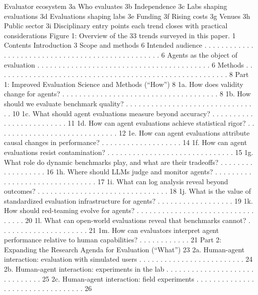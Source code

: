 Evaluator ecosystem
3a Who evaluates
3b Independence
3c Labs shaping evaluations
3d Evaluations shaping labs
3e Funding
3f
Rising costs
3g Venues
3h Public sector
3i
Disciplinary entry points
each trend closes with
practical considerations
Figure 1: Overview of the 33 trends surveyed in this paper.
1
Contents
Introduction
3
Scope and methods
6
Intended audience . . . . . . . . . . . . . . . . . . . . . . . . . . . . . . . . . . . . . . . . . . . . . . . . .
6
Agents as the object of evaluation . . . . . . . . . . . . . . . . . . . . . . . . . . . . . . . . . . . . . . . . .
6
Methods . . . . . . . . . . . . . . . . . . . . . . . . . . . . . . . . . . . . . . . . . . . . . . . . . . . . . . .
8
Part 1: Improved Evaluation Science and Methods (“How”)
8
1a. How does validity change for agents? . . . . . . . . . . . . . . . . . . . . . . . . . . . . . . . . . . . . .
8
1b. How should we evaluate benchmark quality?
. . . . . . . . . . . . . . . . . . . . . . . . . . . . . . . . 10
1c. What should agent evaluations measure beyond accuracy? . . . . . . . . . . . . . . . . . . . . . . . . . 11
1d. How can agent evaluations achieve statistical rigor? . . . . . . . . . . . . . . . . . . . . . . . . . . . . . 12
1e. How can agent evaluations attribute causal changes in performance? . . . . . . . . . . . . . . . . . . . 14
1f. How can agent evaluations resist contamination?
. . . . . . . . . . . . . . . . . . . . . . . . . . . . . . 15
1g. What role do dynamic benchmarks play, and what are their tradeoffs?
. . . . . . . . . . . . . . . . . . 16
1h. Where should LLMs judge and monitor agents? . . . . . . . . . . . . . . . . . . . . . . . . . . . . . . . 17
1i. What can log analysis reveal beyond outcomes? . . . . . . . . . . . . . . . . . . . . . . . . . . . . . . . 18
1j. What is the value of standardized evaluation infrastructure for agents?
. . . . . . . . . . . . . . . . . . 19
1k. How should red-teaming evolve for agents? . . . . . . . . . . . . . . . . . . . . . . . . . . . . . . . . . 20
1l. What can open-world evaluations reveal that benchmarks cannot? . . . . . . . . . . . . . . . . . . . . . 21
1m. How can evaluators interpret agent performance relative to human capabilities?
. . . . . . . . . . . . 21
Part 2: Expanding the Research Agenda for Evaluation (“What”)
23
2a. Human-agent interaction: evaluation with simulated users . . . . . . . . . . . . . . . . . . . . . . . . . 24
2b. Human-agent interaction: experiments in the lab . . . . . . . . . . . . . . . . . . . . . . . . . . . . . . 25
2c. Human-agent interaction: field experiments . . . . . . . . . . . . . . . . . . . . . . . . . . . . . . . . . 26
